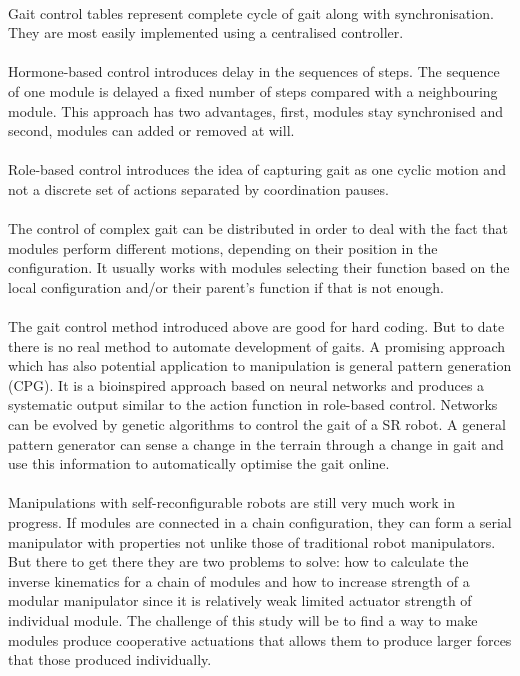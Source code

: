 \paragraph{}Gait control tables represent complete cycle of gait along with synchronisation. They are most easily implemented using a centralised controller.
\paragraph{}Hormone-based control introduces delay in the sequences of steps. The sequence of one module is delayed a fixed number of steps compared with a neighbouring module. This approach has two advantages, first, modules stay synchronised and second, modules can added or removed at will.
\paragraph{}Role-based control introduces the idea of capturing gait as one cyclic motion and not a discrete set of actions separated by coordination pauses.
\paragraph{}The control of complex gait can be distributed in order to deal with the fact that modules perform different motions, depending on their position in the configuration. It usually works with modules selecting their function based on the local configuration and/or their parent's function if that is not enough.
\paragraph{}The gait control method introduced above are good for hard coding. But to date there is no real method to automate development of gaits. A promising approach which has also potential application to manipulation is general pattern generation (CPG). It is a bioinspired approach based on neural networks and produces a systematic output similar to the action function in role-based control. Networks can be evolved by genetic algorithms to control the gait of a SR robot.  A general pattern generator can sense a change in the terrain through a change in gait and use this information to automatically optimise the gait online.
\paragraph{}Manipulations with self-reconfigurable robots are still very much work in progress. If modules are connected in a chain configuration, they can form a serial manipulator with properties not unlike those of traditional robot manipulators. But there to get there they are two problems to solve: how to calculate the inverse kinematics for a chain of modules and how to increase strength of a modular manipulator since it is relatively weak limited actuator strength of individual module. The challenge of this study will be to find a way to make modules produce cooperative actuations that allows them to produce larger forces that those produced individually.
